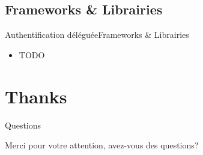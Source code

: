 \documentclass{beamer}
\begin{document}
\subsection{Frameworks \& Librairies}

\begin{frame}{Authentification déléguée}{Frameworks \& Librairies}
  \begin{center}
    \begin{itemize}
    \item TODO
    \end{itemize}
  \end{center}
\end{frame}

\section*{Thanks}

\begin{frame}{Questions}
  \begin{center}
    Merci pour votre attention, avez-vous des questions?
  \end{center}
\end{frame}
\end{document}
